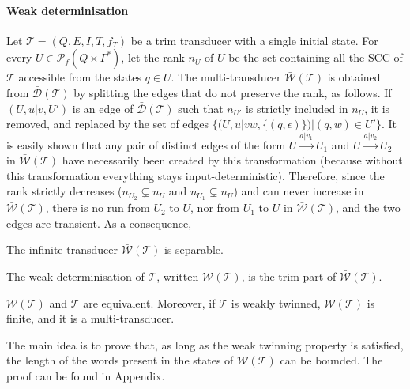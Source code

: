 \documentclass[envcountsame]{llncs}
\newcommand\tra{\mathcal{T}}
\begin{document}
\paragraph{\textbf{Weak determinisation}} Let $\tra = (Q,E,I,T,f_T)$ be a trim transducer with a single initial state.
For every $U \in \mathcal{P}_f(Q \times \Gamma^*)$, let the rank $n_{U}$
of $U$ be the set containing all the SCC of $\tra$ accessible from the
states $q\in U$. The multi-transducer $\bar{\mathcal{W}}(\tra)$ is obtained from $\bar{\mathcal{D}}(\tra)$ by splitting the edges that do not preserve the rank, as follows.
If $(U,u|v,U')$ is an edge of $\bar{\mathcal{D}}(\tra)$ such that
$n_{U'}$ is strictly included in $n_{U}$, it is removed, and replaced
by the set of edges $\{ (U,u|vw,\{(q,\epsilon)\}) | (q,w) \in
U'\}$. It is easily shown that any pair of distinct edges of the form 
$U\xrightarrow{a|v_1} U_1$ and $U\xrightarrow{a|v_2} U_2$ in $\bar{\mathcal{W}}(\tra)$ have necessarily been
created by this transformation (because without this transformation
everything stays input-deterministic). Therefore, since the rank
strictly decreases ($n_{U_2}\subsetneq n_U$ and $n_{U_1}\subsetneq
n_U$) and can never increase in $\bar{\mathcal{W}}(\tra)$, there is no
run from $U_2$ to $U$, nor from $U_1$ to $U$ in
$\bar{\mathcal{W}}(\tra)$, and the two edges are transient. As a
consequence, 

\begin{lemma}\label{lem:separable}
The infinite transducer $\bar{\mathcal{W}}(\tra)$ is separable.
\end{lemma}


The weak determinisation of $\tra$, written $\mathcal{W}(\tra)$, is the trim part of $\bar{\mathcal{W}}(\tra)$.


\begin{proposition}\label{weakdet}
$\mathcal{W}(\tra)$ and $\tra$ are equivalent. Moreover, 
if $\tra$ is weakly twinned, $\mathcal{W}(\tra)$ is finite, and it
is a multi-transducer.
\end{proposition}

The main idea is to prove that, as long as the weak twinning property
is satisfied, the length of the words present in the states of
$\mathcal{W}(\tra)$ can be bounded. The proof can be found in
Appendix. 
\end{document}
